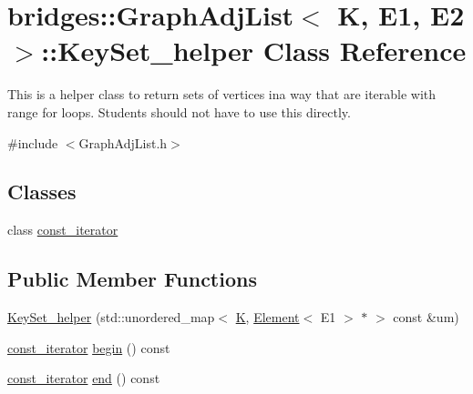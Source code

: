 \hypertarget{classbridges_1_1_graph_adj_list_1_1_key_set__helper}{}\section{bridges\+:\+:Graph\+Adj\+List$<$ K, E1, E2 $>$\+:\+:Key\+Set\+\_\+helper Class Reference}
\label{classbridges_1_1_graph_adj_list_1_1_key_set__helper}


This is a helper class to return sets of vertices ina way that are iterable with range for loops. Students should not have to use this directly.  




{\ttfamily \#include $<$Graph\+Adj\+List.\+h$>$}

\subsection*{Classes}
\begin{DoxyCompactItemize}
\item 
class \hyperlink{classbridges_1_1_graph_adj_list_1_1_key_set__helper_1_1const__iterator}{const\+\_\+iterator}
\end{DoxyCompactItemize}
\subsection*{Public Member Functions}
\begin{DoxyCompactItemize}
\item 
\hyperlink{classbridges_1_1_graph_adj_list_1_1_key_set__helper_a60ca294eeeae0ebf9d357ff4f197214e}{Key\+Set\+\_\+helper} (std\+::unordered\+\_\+map$<$ \hyperlink{namespacebridges_acfb0a4f7877d8f63de3e6862004c50edaa5f3c6a11b03839d46af9fb43c97c188}{K}, \hyperlink{classbridges_1_1_element}{Element}$<$ E1 $>$ $\ast$ $>$ const \&um)
\item 
\hyperlink{classbridges_1_1_graph_adj_list_1_1_key_set__helper_1_1const__iterator}{const\+\_\+iterator} \hyperlink{classbridges_1_1_graph_adj_list_1_1_key_set__helper_a13d241840008e50b94b3d12fbd897ebd}{begin} () const
\item 
\hyperlink{classbridges_1_1_graph_adj_list_1_1_key_set__helper_1_1const__iterator}{const\+\_\+iterator} \hyperlink{classbridges_1_1_graph_adj_list_1_1_key_set__helper_a581dd1d192896998e9d24bfa694c9036}{end} () const
\end{DoxyCompactItemize}


